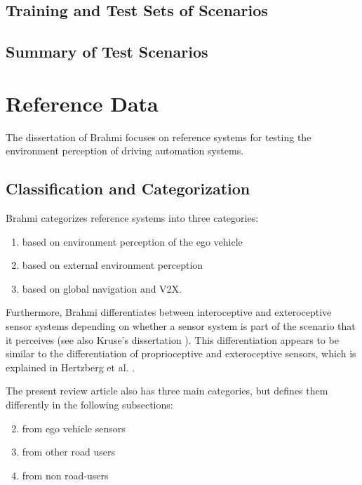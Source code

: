 \documentclass[conference]{IEEEtran}
\newcommand{\new}[1]{{\color{my-red}#1}}
\begin{document}
\subsection{Training and Test Sets of Scenarios}
\label{sec:scenarios_different_sets}
\subsection{Summary of Test Scenarios}




\section{Reference Data}
\label{sec:axis_ref_data}

The dissertation of Brahmi \cite{Brahmi2020diss} focuses on reference systems for testing the environment perception of driving automation systems. 

\subsection{\new{Classification and Categorization}}
Brahmi \cite{Brahmi2020diss} categorizes reference systems into three categories:
\begin{enumerate}[I]
\item based on environment perception of the ego vehicle
\item based on external environment perception
\item based on global navigation and V2X.
\end{enumerate}
Furthermore, Brahmi \cite{Brahmi2020diss} differentiates between interoceptive and exteroceptive sensor systems depending on whether a sensor system is part of the scenario that it perceives (see also Kruse's dissertation \cite{Kruse2013mehrobjekt}). 
This differentiation appears to be similar to the differentiation of proprioceptive and exteroceptive sensors, which is explained in Hertzberg et al. \cite{Hertzberg2012roboter}.


The present review article also has three main categories, but defines them differently in the following subsections:
\begin{enumerate}[A]\setcounter{enumi}{1}
\item from ego vehicle sensors
\item from other road users
\item from non road-users
\end{enumerate}
\end{document}
